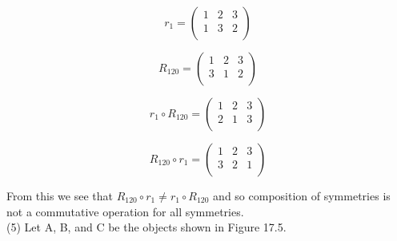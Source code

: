 \documentclass[11pt,a4paper]{article}
\begin{document}
\[
r_1 = \left(\begin{array}{ccc}
1&2&3\\
1&3&2\\
\end{array}\right)
\]

\[
R_{120} = \left(\begin{array}{ccc}
1&2&3\\
3&1&2\\
\end{array}\right)
\]

\[
r_1\circ R_{120} = \left(\begin{array}{ccc}
1&2&3\\
2&1&3\\
\end{array}\right)
\]

\[
 R_{120}\circ r_1 = \left(\begin{array}{ccc}
1&2&3\\
3&2&1\\
\end{array}\right)
\]

From this we see that $ R_{120}\circ r_1 \neq r_1\circ R_{120}$ and so composition of symmetries is not a commutative operation for all symmetries.\\

(5) Let A, B, and C be the objects shown in Figure 17.5.\\
\newpage
~\vspace{15mm}\\
\end{document}
